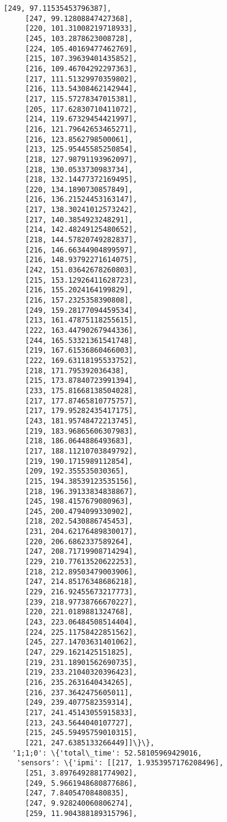 \documentclass[11pt]{article}
\begin{document}
\begin{tcolorbox}[breakable, size=fbox, boxrule=.5pt, pad at break*=1mm, opacityfill=0]
\begin{Verbatim}[commandchars=\\\{\}]
     [249, 97.11535453796387],
     [247, 99.12808847427368],
     [220, 101.31008219718933],
     [245, 103.2878623008728],
     [224, 105.40169477462769],
     [215, 107.39639401435852],
     [216, 109.46704292297363],
     [217, 111.51329970359802],
     [216, 113.54308462142944],
     [217, 115.57278347015381],
     [205, 117.62830710411072],
     [214, 119.67329454421997],
     [216, 121.79642653465271],
     [216, 123.8562798500061],
     [213, 125.95445585250854],
     [218, 127.98791193962097],
     [218, 130.0533730983734],
     [218, 132.14477372169495],
     [220, 134.1890730857849],
     [216, 136.21524453163147],
     [217, 138.30241012573242],
     [217, 140.3854923248291],
     [214, 142.48249125480652],
     [218, 144.57820749282837],
     [216, 146.66344904899597],
     [216, 148.93792271614075],
     [242, 151.03642678260803],
     [215, 153.12926411628723],
     [216, 155.2024164199829],
     [216, 157.2325358390808],
     [249, 159.28177094459534],
     [213, 161.47875118255615],
     [222, 163.44790267944336],
     [244, 165.53321361541748],
     [219, 167.61536860466003],
     [222, 169.63118195533752],
     [218, 171.795392036438],
     [215, 173.87840723991394],
     [233, 175.81668138504028],
     [217, 177.87465810775757],
     [217, 179.95282435417175],
     [243, 181.95748472213745],
     [219, 183.96865606307983],
     [218, 186.0644886493683],
     [217, 188.11210703849792],
     [219, 190.1715989112854],
     [209, 192.355535030365],
     [215, 194.38539123535156],
     [218, 196.39133834838867],
     [245, 198.4157679080963],
     [245, 200.4794099330902],
     [218, 202.5430886745453],
     [231, 204.62176489830017],
     [220, 206.6862337589264],
     [247, 208.71719908714294],
     [229, 210.77613520622253],
     [218, 212.89503479003906],
     [247, 214.85176348686218],
     [229, 216.92455673217773],
     [239, 218.97738766670227],
     [220, 221.0189881324768],
     [243, 223.06484508514404],
     [224, 225.11758422851562],
     [245, 227.14703631401062],
     [247, 229.1621425151825],
     [219, 231.18901562690735],
     [219, 233.21040320396423],
     [216, 235.2631640434265],
     [216, 237.3642475605011],
     [249, 239.4077582359314],
     [217, 241.45143055915833],
     [213, 243.5644040107727],
     [215, 245.59495759010315],
     [221, 247.6385133266449]]\}\},
  '1;1;0': \{'total\_time': 52.58105969429016,
   'sensors': \{'ipmi': [[217, 1.9353957176208496],
     [251, 3.8976492881774902],
     [249, 5.9661948680877686],
     [247, 7.84054708480835],
     [247, 9.928240060806274],
     [259, 11.904388189315796],

\end{Verbatim}
\end{tcolorbox}
\end{document}
